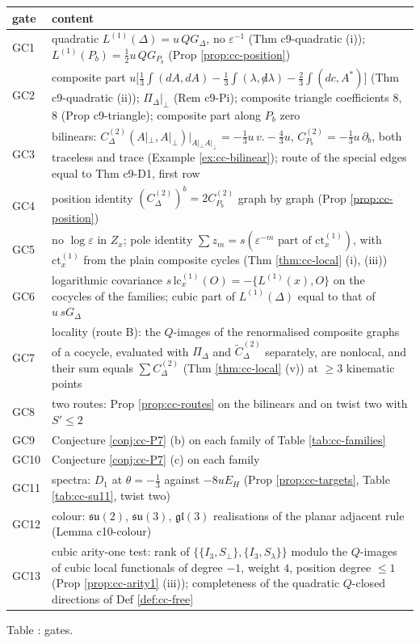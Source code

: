\documentclass[11pt]{article}
\numberwithin{equation}{section}
\theoremstyle{plain}
\theoremstyle{definition}
\newcommand{\Ap}{A|_{\perp}}
\begin{document}
\begin{center}\small
\begin{tabular}{l|p{12.6cm}}
gate & content\\\hline
GC1 & quadratic $L^{(1)}(\Delta)=u\,QG_\Delta$, no $\varepsilon^{-1}$ (Thm c9-quadratic (i)); $L^{(1)}(P_b)=\tfrac12u\,QG_{P_b}$ (Prop \ref{prop:cc-position})\\
GC2 & composite part $u\big[\tfrac13\int(dA,dA)-\tfrac13\int(\lambda,{\not d}\lambda)-\tfrac23\int(dc,A^*)\big]$ (Thm c9-quadratic (ii)); $\Pi_\Delta|_\perp$ (Rem c9-Pi); composite triangle coefficients $8$, $8$ (Prop c9-triangle); composite part along $P_b$ zero\\
GC3 & bilinears: $C^{(2)}_\Delta(\Ap,\Ap)|_{\Ap\Ap}=-\tfrac13u\,v.-\tfrac43u$, $C^{(2)}_{P_b}=-\tfrac13u\,\partial_b$, both traceless and trace (Example \ref{ex:cc-bilinear}); route of the special edges equal to Thm c9-D1, first row\\
GC4 & position identity $(C^{(2)}_\Delta)^b=2C^{(2)}_{P_b}$ graph by graph (Prop \ref{prop:cc-position})\\
GC5 & no $\log\varepsilon$ in $Z_x$; pole identity $\sum z_m=s(\varepsilon^{-m}\text{ part of }\mathrm{ct}^{(1)}_x)$, with $\mathrm{ct}^{(1)}_x$ from the plain composite cycles (Thm \ref{thm:cc-local} (i), (iii))\\
GC6 & logarithmic covariance $s\,\mathrm{lc}^{(1)}_x(O)=-\{L^{(1)}(x),O\}$ on the cocycles of the families; cubic part of $L^{(1)}(\Delta)$ equal to that of $u\,sG_\Delta$\\
GC7 & locality (route B): the $Q$-images of the renormalised composite graphs of a cocycle, evaluated with $\Pi_\Delta$ and $\widetilde C^{(2)}_\Delta$ separately, are nonlocal, and their sum equals $\sum C^{(2)}_\Delta$ (Thm \ref{thm:cc-local} (v)) at $\geq3$ kinematic points\\
GC8 & two routes: Prop \ref{prop:cc-routes} on the bilinears and on twist two with $S'\le2$\\
GC9 & Conjecture \ref{conj:cc-P7} (b) on each family of Table \ref{tab:cc-families}\\
GC10 & Conjecture \ref{conj:cc-P7} (c) on each family\\
GC11 & spectra: $D_1$ at $\theta=-\tfrac13$ against $-8uE_H$ (Prop \ref{prop:cc-targets}, Table \ref{tab:cc-su11}, twist two)\\
GC12 & colour: $\mathfrak{su}(2)$, $\mathfrak{su}(3)$, $\mathfrak{gl}(3)$ realisations of the planar adjacent rule (Lemma c10-colour)\\
GC13 & cubic arity-one test: rank of $\{\{I_3,S_\perp\},\{I_3,S_\lambda\}\}$ modulo the $Q$-images of cubic local functionals of degree $-1$, weight $4$, position degree $\le1$ (Prop \ref{prop:cc-arity1} (iii)); completeness of the quadratic $Q$-closed directions of Def \ref{def:cc-free}\\
\end{tabular}
\end{center}
\begin{center}\small Table \theequation\label{tab:cc-gates}: gates.\end{center}
\end{document}
